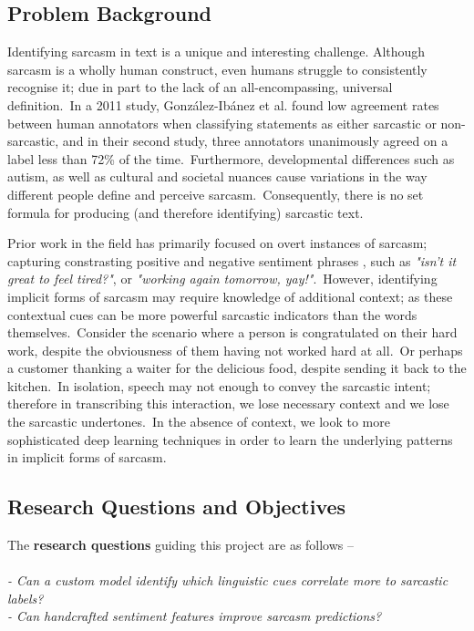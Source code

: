 \documentclass[12pt,a4paper]{article}
\begin{document}

\subsection{Problem Background}\vspace{-4.2pt}
\noindent Identifying sarcasm in text is a unique and interesting challenge. Although sarcasm is a wholly human construct, even humans struggle to consistently recognise it; due in part to the lack of an all-encompassing, universal definition.\ In a 2011 study, Gonz{\'a}lez-Ib{\'a}nez et al. \cite{gonzalez2011identifying} found low agreement rates between human annotators when classifying statements as either sarcastic or non-sarcastic, and in their second study, three annotators unanimously agreed on a label less than 72\% of the time.\ Furthermore, developmental differences such as autism, as well as cultural and societal nuances cause variations in the way different people define and perceive sarcasm.\ Consequently, there is no set formula for producing (and therefore identifying) sarcastic text.

Prior work in the field has primarily focused on overt instances of sarcasm; capturing constrasting positive and negative sentiment phrases \cite{riloff2013sarcasm}, such as \textit{"isn't it great to feel tired?"}, or \textit{"working again tomorrow, yay!"}.\ However, identifying implicit forms of sarcasm may require knowledge of additional context; as these contextual cues can be more powerful sarcastic indicators than the words themselves.\ Consider the scenario where a person is congratulated on their hard work, despite the obviousness of them having not worked hard at all.\ Or perhaps a customer thanking a waiter for the delicious food, despite sending it back to the kitchen.\ In isolation, speech may not enough to convey the sarcastic intent; therefore in transcribing this interaction, we lose necessary context and we lose the sarcastic undertones.\ In the absence of context, we look to more sophisticated deep learning techniques in order to learn the underlying patterns in implicit forms of sarcasm.

\subsection{Research Questions and Objectives}
\vspace{-6.2pt}
\noindent The \textbf{research questions} guiding this project are as follows --\\
\\ 
\indent \textit{- Can a custom model identify which linguistic cues correlate more to sarcastic labels?}\\
\indent \textit{- Can handcrafted sentiment features improve sarcasm predictions?}\\ 
\\\vspace{-6pt}
\end{document}
